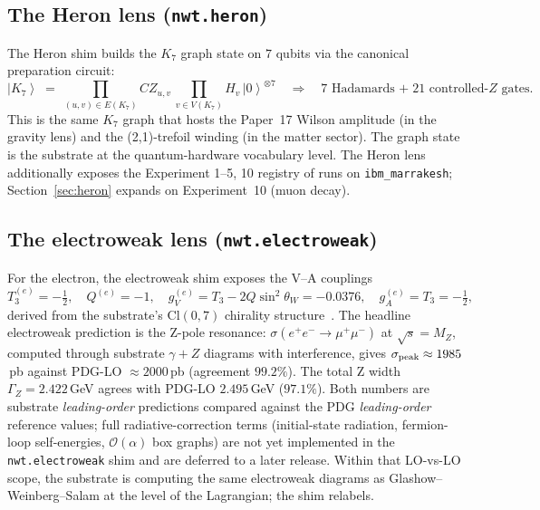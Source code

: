 \documentclass[11pt]{article}
\newcommand{\ket}[1]{\left|#1\right\rangle}
\begin{document}
\subsection{The Heron lens (\texttt{nwt.heron})}
\label{sec:multiview-heron}

The Heron shim builds the $K_7$ graph state on $7$ qubits via the
canonical preparation circuit:
\begin{equation}
  \ket{K_7}
   \;=\;
   \prod_{(u, v) \in E(K_7)} CZ_{u, v}\,
   \prod_{v \in V(K_7)} H_v\,\ket{0}^{\otimes 7}
   \quad\Longrightarrow\quad
   \text{$7$ Hadamards $+\;21$ controlled-$Z$ gates}.
\end{equation}
This is the same $K_7$ graph that hosts the Paper~17 Wilson
amplitude (in the gravity lens) and the (2,1)-trefoil winding
(in the matter sector).  The graph state is the substrate at the
quantum-hardware vocabulary level.  The Heron lens additionally
exposes the Experiment 1--5, 10 registry of runs on
\texttt{ibm\_marrakesh}; Section~\ref{sec:heron} expands on
Experiment~10 (muon decay).

\subsection{The electroweak lens (\texttt{nwt.electroweak})}
\label{sec:multiview-electroweak}

For the electron, the electroweak shim exposes the V--A couplings
\begin{equation}
  T_3^{(e)} = -\tfrac{1}{2},
  \quad
  Q^{(e)} = -1,
  \quad
  g_V^{(e)} = T_3 - 2Q\sin^2\theta_W = -0.0376,
  \quad
  g_A^{(e)} = T_3 = -\tfrac{1}{2},
\end{equation}
derived from the substrate's $\mathrm{Cl}(0,7)$ chirality
structure~\cite{paper17}.  The headline electroweak
prediction is the Z-pole resonance: $\sigma(e^+ e^- \to \mu^+ \mu^-)$
at $\sqrt{s} = M_Z$, computed through substrate $\gamma + Z$
diagrams with interference, gives
$\sigma_{\rm peak} \approx 1985$\,pb against PDG-LO $\approx 2000$\,pb
(agreement $99.2\%$).  The total Z width
$\Gamma_Z = 2.422$\,GeV agrees with PDG-LO $2.495$\,GeV ($97.1\%$).
Both numbers are substrate \emph{leading-order} predictions
compared against the PDG \emph{leading-order} reference values;
full radiative-correction terms (initial-state radiation,
fermion-loop self-energies, $\mathcal{O}(\alpha)$ box graphs)
are not yet implemented in the \texttt{nwt.electroweak} shim
and are deferred to a later release.  Within that LO-vs-LO
scope, the substrate is computing the same electroweak diagrams
as Glashow--Weinberg--Salam at the level of the Lagrangian;
the shim relabels.
\end{document}
